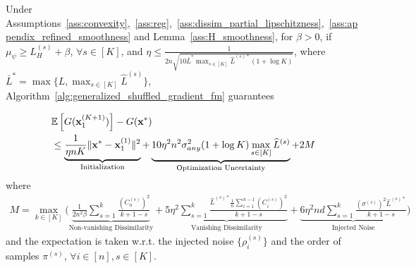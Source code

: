 \begin{theorem}
\label{thm:convergence_generalized_shufflg_fm_appendix}

    Under Assumptions~\ref{ass:convexity},~\ref{ass:reg},~\ref{ass:dissim_partial_lipschitzness},~\ref{ass:appendix_refined_smoothness} and Lemma~\ref{ass:H_smoothness}, for $\beta > 0$, 
    if $\mu_{\psi} \geq L_H^{(s)} + \beta$, $\forall s\in [K]$, and 
     $\eta \leq \frac{1}{2n \sqrt{10 \bar{L}^* \max_{s\in [K]}\widehat{L}^{(s)*} (1+\log K)}}$, 
    where $\bar{L}^* = \max\{L, \max_{s\in[K]} \widehat{L}^{(s)}\}$,
    Algorithm~\ref{alg:generalized_shuffled_gradient_fm} guarantees

    \begin{align}
        &\mathbb{E}\left[ G({\mathbf{x}}_1^{(K+1)}) \right] - G({\mathbf{x}}^*)\\
        \nonumber
        &\leq \underbrace{ \frac{1}{\eta n K} \|{\mathbf{x}}^* - {\mathbf{x}}_1^{(1)}\|^2 
        }_{\text{Initialization}}
        + \underbrace{ 10 \eta^2 n^2 \sigma_{any}^2 (1+\log K)\max_{s\in[K]} \widehat{L}^{(s)} 
        }_{\text{Optimization Uncertainty}} + 2 M
    \end{align}
    where
    \begin{align*}
        M = \max_{k\in [K]} \Big(
        \underbrace{ \frac{1}{2n^2 \beta}\sum_{s=1}^{k} \frac{ (C_n^{(s)})^2 }{k+1-s}
        }_{\text{Non-vanishing Dissimilarity}}
        + \underbrace{5\eta^2 \sum_{s=1}^{k} \frac{ \widehat{L}^{(s)*} \frac{1}{n}\sum_{i=1}^{n-1}(C_i^{(s)})^2} {k+1-s} }_{\text{Vanishing Dissimilarity}}
        + \underbrace{ 6\eta^2 nd \sum_{s=1}^{k} \frac{ (\sigma^{(s)})^2 \widehat{L}^{(s)*} }{k+1-s} }_{\text{Injected Noise}} \Big)
    \end{align*}
    and the expectation is taken w.r.t. the injected noise $\{\rho_i^{(s)}\}$ and the order of samples $\pi^{(s)}$, $\forall i\in [n], s\in [K]$.
\end{theorem}


